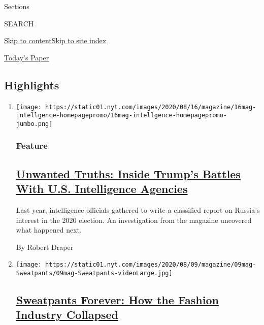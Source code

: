 Sections

SEARCH

\protect\hyperlink{site-content}{Skip to
content}\protect\hyperlink{site-index}{Skip to site index}

\href{https://myaccount.nytimes.com/auth/login?response_type=cookie\&client_id=vi}{}

\href{https://www.nytimes.com/section/todayspaper}{Today's Paper}

\hypertarget{highlights}{%
\subsection{Highlights}\label{highlights}}

\begin{enumerate}
\def\labelenumi{\arabic{enumi}.}
\item
  \texttt{[image: https://static01.nyt.com/images/2020/08/16/magazine/16mag-intellgence-homepagepromo/16mag-intellgence-homepagepromo-jumbo.png]}

  \hypertarget{feature}{%
  \subsubsection{Feature}\label{feature}}

  \hypertarget{unwanted-truths-inside-trumps-battles-with-us-intelligence-agencies}{%
  \subsection{\texorpdfstring{\href{/2020/08/08/magazine/us-russia-intelligence.html}{Unwanted
  Truths: Inside Trump's Battles With U.S. Intelligence
  Agencies}}{Unwanted Truths: Inside Trump's Battles With U.S. Intelligence Agencies}}\label{unwanted-truths-inside-trumps-battles-with-us-intelligence-agencies}}

  Last year, intelligence officials gathered to write a classified
  report on Russia's interest in the 2020 election. An investigation
  from the magazine uncovered what happened next.

  By Robert Draper
\item
  \texttt{[image: https://static01.nyt.com/images/2020/08/09/magazine/09mag-Sweatpants/09mag-Sweatpants-videoLarge.jpg]}

  \hypertarget{sweatpants-forever-how-the-fashion-industry-collapsed}{%
  \subsection{\texorpdfstring{\href{/interactive/2020/08/06/magazine/fashion-sweatpants.html}{Sweatpants
  Forever: How the Fashion Industry
  Collapsed}}{Sweatpants Forever: How the Fashion Industry Collapsed}}\label{sweatpants-forever-how-the-fashion-industry-collapsed}}


\end{enumerate}
